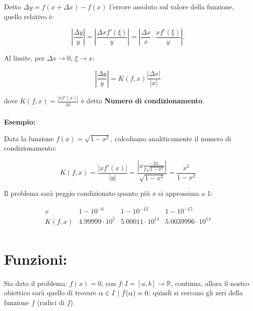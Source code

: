 \documentclass[a4paper, 11pt]{article}
\begin{document}
        Detto \( \Delta y = f(x + \Delta x) - f(x) \) l'errore assoluto sul valore della funzione, quello relativo è:

        \[
            \left| \frac{\Delta y}{y} \right| = \left| \frac{\Delta x f'(\xi)}{y} \right| = \left| \frac{\Delta x}{x} \cdot \frac{x f'(\xi)}{y} \right|.
        \]

        Al limite, per \( \Delta x \to 0 \), \( \xi \to x \):

        \[
            \left| \frac{\Delta y}{y} \right| = K(f, x) \frac{|\Delta x|}{|x|}
        \]

        dove  $K(f, x) = \frac{|x f'(x)|}{|y|}$ è detto \textbf{Numero di condizionamento}.

        \paragraph{}
        \textbf{Esempio:}

        Data la funzione \( f(x) = \sqrt{1 - x^2} \), calcoliamo analiticamente il numero di condizionamento:


        \[
            K(f, x) = \frac{|x f'(x)|}{|y|} = \frac{|x \frac{-2x}{2\sqrt{1 - x^2}}|}{\sqrt{1 - x^2}} = \frac{x^2}{1 - x^2}
        \]



        Il problema sarà peggio condizionato quanto più \( x \) si approssima a 1:

        \[
        \begin{array}{c|c|c|c|c}
            x & 1 - 10^{-6} & 1 - 10^{-12} & 1 - 10^{-15} \\ \hline
            K(f, x) & 4.99999 \cdot 10^5 & 5.00011 \cdot 10^{11} & 5.0039996 \cdot 10^{14} \\
        \end{array}
        \]

        

    \section{Funzioni:}
        
        \paragraph{}
        Sia dato il problema: \( f(x) = 0 \), con \( f: I = [a, b] \to \mathbb{R} \), continua, allora il nostro obiettico sarà quello di trovare \( \alpha \in I$ $|$ $f(\alpha) = 0\); quindi si cercano gli zeri della funzione $f$ (radici di $f$) 
        
\end{document}
